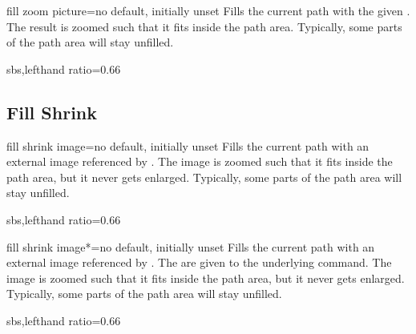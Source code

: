 \begin{docTikzKey}{fill zoom picture}{=}{no default, initially unset}
  Fills the current path with the given .
  The result is zoomed such that it fits inside the path area.
  Typically, some parts of the path area will stay unfilled.
\begin{dispExample*}{sbs,lefthand ratio=0.66}
\end{dispExample*}
\end{docTikzKey}


\clearpage
\subsection{Fill Shrink}
\begin{docTikzKey}{fill shrink image}{=}{no default, initially unset}
  Fills the current path with an external image referenced by .
  The image is zoomed such that it fits inside the path area, but it never
  gets enlarged.
  Typically, some parts of the path area will stay unfilled.
\begin{dispExample*}{sbs,lefthand ratio=0.66}
\end{dispExample*}
\end{docTikzKey}


\begin{docTikzKey}{fill shrink image*}{=}{no default, initially unset}
  Fills the current path with an external image referenced by .
  The  are given to the underlying  command.
  The image is zoomed such that it fits inside the path area, but it never
  gets enlarged.
  Typically, some parts of the path area will stay unfilled.
\begin{dispExample*}{sbs,lefthand ratio=0.66}
\end{dispExample*}
\end{docTikzKey}


